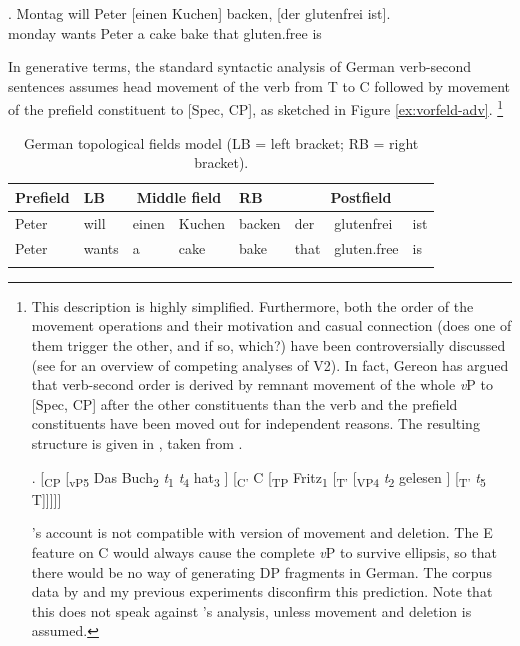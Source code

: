 \exg. Montag will Peter [einen Kuchen] backen, [der glutenfrei ist].\\
monday wants Peter a cake bake that gluten.free is\\

In generative terms, the standard syntactic analysis of German verb-second sentences assumes head movement of the verb from T to C followed by movement of the prefield constituent to [Spec, CP], as sketched in Figure \ref{ex:vorfeld-adv}.%
%
\footnote{This description is highly simplified. Furthermore, both the order of the movement operations and their motivation and casual connection (does one of them trigger the other, and if so, which?) have been controversially discussed (see \citet{brandner2004} for an overview of competing analyses of V2). In fact, Gereon \citet{muller2004} has argued that verb-second order is derived by remnant movement of the whole \textit{v}P to [Spec, CP] after the other constituents than the verb and the prefield constituents have been moved out for independent reasons. The resulting structure is given in \Next, taken from \citep[181]{muller2004}.

\ex. [\textsubscript{CP} [\textsubscript{vP}\textsubscript{5} Das Buch\textsubscript{2} \textit{t}\textsubscript{1} \textit{t}\textsubscript{4} hat\textsubscript{3} ] [\textsubscript{C'} C [\textsubscript{TP} Fritz\textsubscript{1} [\textsubscript{T'} [\textsubscript{VP}\textsubscript{4} \textit{t}\textsubscript{2} gelesen ] [\textsubscript{T'} \textit{t}\textsubscript{5} T]]]]]

\citeauthor{muller2004}'s account is not compatible with  version of movement and deletion. The E feature on C would always cause the complete \textit{v}P to survive ellipsis, so that there would be no way of generating DP fragments in German. The corpus data by \citet{reich2017} and my previous experiments disconfirm this prediction. Note that this does not speak against \citeauthor{muller2004}'s analysis, unless movement and deletion is assumed.}\afterfn

\begin{table}
\begin{tabular}{l l l l l l l l}
\lsptoprule
Prefield & LB & \multicolumn{2}{c}{Middle field} & RB & \multicolumn{3}{c}{Postfield}  \\   
\midrule
Peter & will & einen & Kuchen & backen & der & glutenfrei & ist\\
Peter & wants & a & cake & bake & that & gluten.free & is\\
\lspbottomrule
\end{tabular}
\caption{German topological fields model (LB = left bracket; RB = right bracket).\label{tab:feldermodell}}
\end{table}

